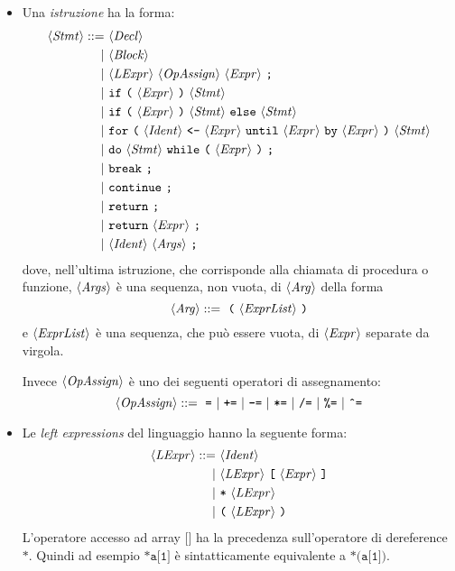 \begin{itemize}
	\item Una \emph{istruzione} ha la forma:
	\begin{align*}
	\langle \mathit{Stmt} \rangle ::=\ &\langle \mathit{Decl} \rangle\\
	|\ &\langle \mathit{Block} \rangle\\
	|\ &\langle \mathit{LExpr} \rangle\ \langle \mathit{OpAssign} \rangle\ \langle \mathit{Expr} \rangle\ \texttt{;}\\
	|\ &\texttt{if}\ \texttt{(}\ \langle \mathit{Expr} \rangle\ \texttt{)}\ \langle \mathit{Stmt} \rangle\\
	|\ &\texttt{if}\ \texttt{(}\ \langle \mathit{Expr} \rangle\ \texttt{)}\ \langle \mathit{Stmt} \rangle\ \texttt{else}\ \langle \mathit{Stmt} \rangle\\
	|\ &\texttt{for}\ \texttt{(}\ \langle \mathit{Ident} \rangle\ \texttt{<-}\ \langle \mathit{Expr} \rangle\ \texttt{until}\ \langle \mathit{Expr} \rangle\ \texttt{by}\ \langle \mathit{Expr} \rangle\ \texttt{)}\ \langle \mathit{Stmt} \rangle\\
	|\ &\texttt{do}\ \langle \mathit{Stmt} \rangle\ \texttt{while}\ \texttt{(}\ \langle \mathit{Expr} \rangle\ \texttt{)}\ \texttt{;}\\
	|\ &\texttt{break}\ \texttt{;}\\
 	|\ &\texttt{continue}\ \texttt{;}\\
	|\ &\texttt{return}\ \texttt{;}\\
	|\ &\texttt{return}\ \langle \mathit{Expr} \rangle\ \texttt{;}\\
	|\ &\langle \mathit{Ident} \rangle\ \langle \mathit{Args} \rangle\ \texttt{;}
	\end{align*}
	dove, nell'ultima istruzione, che corrisponde alla chiamata di procedura o funzione, $\langle \mathit{Args} \rangle$ è una sequenza, non vuota, di $\langle \mathit{Arg} \rangle$ della forma
	\begin{equation*}
	\langle \mathit{Arg} \rangle ::=\ \texttt{(}\ \langle \mathit{ExprList} \rangle\ \texttt{)}
	\end{equation*}
	e $\langle \mathit{ExprList} \rangle$ è una sequenza, che può essere vuota, di $\langle \mathit{Expr} \rangle$ separate da virgola.
	
	Invece $\langle \mathit{OpAssign} \rangle$ è uno dei seguenti operatori di assegnamento:
	\begin{equation*}
	\langle \mathit{OpAssign} \rangle ::=\ \texttt{=}\ |\ \texttt{+=}\ |\ \texttt{-=}\ |\ \texttt{*=}\ |\ \texttt{/=}\ |\ \texttt{\%=}\ |\ \texttt{\^{}=}
	\end{equation*}
	
	\item Le \emph{left expressions} del linguaggio hanno la seguente forma:
	\begin{align*}
	\langle \mathit{LExpr} \rangle ::=\ &\langle \mathit{Ident} \rangle\\
	|\ &\langle \mathit{LExpr} \rangle\ \texttt{[}\ \langle \mathit{Expr} \rangle\ \texttt{]}\\
	|\ &\texttt{*}\ \langle \mathit{LExpr} \rangle\\
	|\ &\texttt{(}\ \langle \mathit{LExpr} \rangle\ \texttt{)}
	\end{align*}
	L'operatore accesso ad array $\texttt{[]}$ ha la precedenza sull'operatore di dereference $\texttt{*}$. Quindi ad esempio $\texttt{*a[1]}$ è sintatticamente equivalente a $\texttt{*(a[1])}$.
	

\end{itemize}
